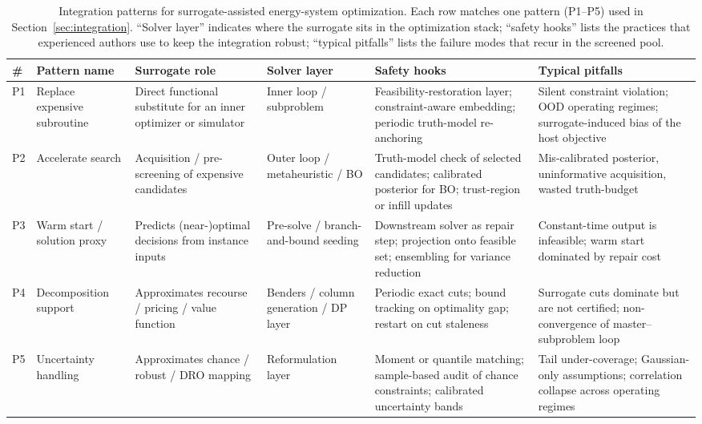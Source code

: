 \begin{table}[!t]
  \centering
  \scriptsize
  \caption{Integration patterns for surrogate-assisted energy-system
  optimization. Each row matches one pattern (P1--P5) used in
  Section~\ref{sec:integration}. ``Solver layer'' indicates where the
  surrogate sits in the optimization stack; ``safety hooks'' lists the
  practices that experienced authors use to keep the integration
  robust; ``typical pitfalls'' lists the failure modes that recur in
  the screened pool.}
  \label{tab:T5-integration-patterns}
  \renewcommand{\arraystretch}{1.25}
  \begin{tabularx}{\textwidth}{@{}L{0.04\textwidth} L{0.16\textwidth} L{0.16\textwidth} L{0.18\textwidth} L{0.20\textwidth} L{0.18\textwidth}@{}}
    \toprule
    \# & Pattern name & Surrogate role & Solver layer & Safety hooks & Typical pitfalls \\
    \midrule
    P1 & Replace expensive subroutine
       & Direct functional substitute for an inner optimizer or simulator
       & Inner loop / subproblem
       & Feasibility-restoration layer; constraint-aware embedding; periodic truth-model re-anchoring \cite{Wu2022231,Chen20244723,Chen2022,Liu20242534}
       & Silent constraint violation; OOD operating regimes; surrogate-induced bias of the host objective \\
    P2 & Accelerate search
       & Acquisition / pre-screening of expensive candidates
       & Outer loop / metaheuristic / BO
       & Truth-model check of selected candidates; calibrated posterior for BO; trust-region or infill updates \cite{Nikolaidis2021,Aghaei Pour2022303,Han2018622,Lin2023}
       & Mis-calibrated posterior, uninformative acquisition, wasted truth-budget \\
    P3 & Warm start / solution proxy
       & Predicts (near-)optimal decisions from instance inputs
       & Pre-solve / branch-and-bound seeding
       & Downstream solver as repair step; projection onto feasible set; ensembling for variance reduction \cite{Li2023__2,Chen20244723,Liang20246508,Thrampoulidis2021}
       & Constant-time output is infeasible; warm start dominated by repair cost \\
    P4 & Decomposition support
       & Approximates recourse / pricing / value function
       & Benders / column generation / DP layer
       & Periodic exact cuts; bound tracking on optimality gap; restart on cut staleness \cite{Zhang2025__4,Wu2024391}
       & Surrogate cuts dominate but are not certified; non-convergence of master--subproblem loop \\
    P5 & Uncertainty handling
       & Approximates chance / robust / DRO mapping
       & Reformulation layer
       & Moment or quantile matching; sample-based audit of chance constraints; calibrated uncertainty bands \cite{Muhlpfordt20194806,Safta20172535,Hu2020,Chen2023657}
       & Tail under-coverage; Gaussian-only assumptions; correlation collapse across operating regimes \\
    \bottomrule
  \end{tabularx}
\end{table}

